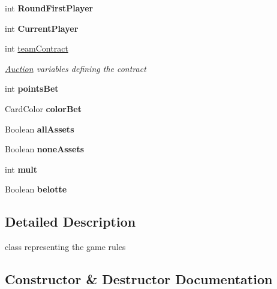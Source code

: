 \begin{DoxyCompactItemize}
int {\bfseries Round\+First\+Player}
\item 
\mbox{\label{class_coinche_1_1_game_rules_affa038242e1eeafa16a92f8ca57a93fc}} 
int {\bfseries Current\+Player}
\item 
int \hyperlink{class_coinche_1_1_game_rules_aeff13015478623c4910c1ceac846828e}{team\+Contract}
\begin{DoxyCompactList}\small\item\em \hyperlink{class_coinche_1_1_auction}{Auction} variables defining the contract \end{DoxyCompactList}\item 
\mbox{\label{class_coinche_1_1_game_rules_aa84ce93c390cd9f6096599fe3597ec56}} 
int {\bfseries points\+Bet}
\item 
\mbox{\label{class_coinche_1_1_game_rules_ac71f616a8bda989ee0e6bb2495556a76}} 
Card\+Color {\bfseries color\+Bet}
\item 
\mbox{\label{class_coinche_1_1_game_rules_a4d4cc301a433dcd8da0dcbabf22d1dc3}} 
Boolean {\bfseries all\+Assets}
\item 
\mbox{\label{class_coinche_1_1_game_rules_a764cd5d781d8b237eed03d849020cae8}} 
Boolean {\bfseries none\+Assets}
\item 
\mbox{\label{class_coinche_1_1_game_rules_aff6d73394208771bfb4a3a21f83aaf16}} 
int {\bfseries mult}
\item 
\mbox{\label{class_coinche_1_1_game_rules_a6c8bfec5e0a8aad0935a5ed45b2fc5fc}} 
Boolean {\bfseries belotte}
\end{DoxyCompactItemize}


\subsection{Detailed Description}
class representing the game rules 



\subsection{Constructor \& Destructor Documentation}
\mbox{\label{class_coinche_1_1_game_rules_a48e1130afad00673e21c933cb0ed84e0}} 
